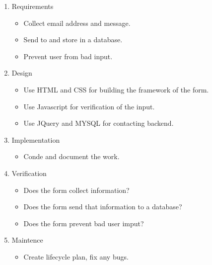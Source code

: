         \begin{enumerate}
            \item Requirements
                \begin{itemize}
                    \item Collect email address and message.
                    \item Send to and store in a database.
                    \item Prevent user from bad input.
                \end{itemize}
            \item Design
                \begin{itemize}
                    \item Use HTML and CSS for building the framework of the form.
                    \item Use Javascript for verification of the input.
                    \item Use JQuery and MYSQL for contacting backend.
                \end{itemize}
            \item Implementation
                \begin{itemize}
                    \item Conde and document the work.
                \end{itemize}
            \item Verification
                \begin{itemize}
                    \item Does the form collect information?
                    \item Does the form send that information to a database?
                    \item Does the form prevent bad user imput?
                \end{itemize}
            \item Maintence
                \begin{itemize}
                    \item Create lifecycle plan, fix any bugs.
                \end{itemize}
        \end{enumerate}